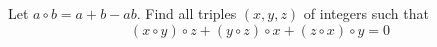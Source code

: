 Let $a\circ b=a+b-ab$. Find all triples $(x,y,z)$ of integers such that\[(x\circ y)\circ z +(y\circ z)\circ x +(z\circ x)\circ y=0\]